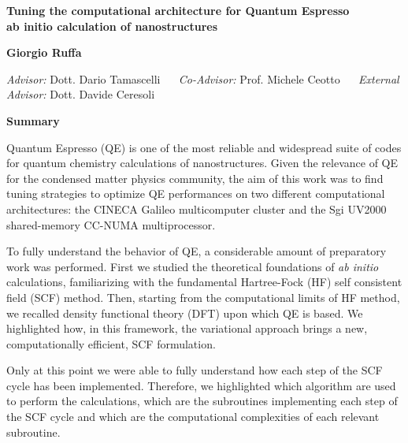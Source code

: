 \documentclass[a4paper,10pt]{article}
\begin{document}
\thispagestyle{plain}
\begin{center}
	\vspace*{-4cm}
    \Large
    \textbf{ Tuning the computational architecture for Quantum Espresso\\ab initio calculation of nanostructures }
    
    \vspace{0.3cm}
    \textbf{Giorgio Ruffa}
    
	\begin{small}
	\textit{Advisor:} Dott. Dario Tamascelli ~~ \textit{Co-Advisor:} Prof. Michele Ceotto ~~ \textit{External Advisor:} Dott. Davide Ceresoli
	\end{small}
	
    
    \vspace{0.2cm}
    \textbf{Summary}
\end{center}

Quantum Espresso (QE) is one of the most reliable and widespread  suite of codes for quantum chemistry calculations of nanostructures\cite{QE}. 
Given the relevance of QE for the condensed matter physics community, the aim of this work was to find tuning strategies to optimize QE performances on two different computational architectures: 
the CINECA Galileo multicomputer cluster and the Sgi UV2000 shared-memory CC-NUMA multiprocessor.

To fully understand the behavior of QE, a considerable amount of preparatory work was performed.
First we studied the theoretical foundations of \textit{ab initio} calculations, familiarizing with the fundamental Hartree-Fock (HF) self consistent field (SCF) method\cite{Attila}.
Then, starting from the computational limits of HF method, we recalled density functional theory (DFT)\cite{Parr} upon which QE is based.
We highlighted how, in this framework, the variational approach brings a new, computationally efficient, SCF formulation\cite{Martin}.

Only at this point we were able to fully understand how each step of the SCF cycle has been implemented\cite{Marx}.
Therefore, we highlighted which algorithm are used to perform the calculations, which are the subroutines implementing each step of the SCF cycle and which are the computational complexities of each relevant subroutine.
\end{document}
